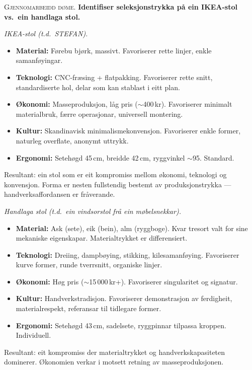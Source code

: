 \documentclass[10pt]{book}
\theoremstyle{definition}
\theoremstyle{plain}
\theoremstyle{remark}
\newenvironment{gjennomgang}%
  {\medskip\noindent\textsc{Gjennomarbeidd d\o me.}\enspace}%
  {\medskip}
\begin{document}
\begin{gjennomgang}
\textbf{Identifiser seleksjonstrykka p\aa{} ein IKEA-stol vs.\ ein handlaga stol.}

\textit{IKEA-stol (t.d.\ STEFAN).}
\begin{itemize}[nosep]
  \item \textbf{Material:} F\o rebu bj\o rk, massivt. Favoriserer rette linjer, enkle samanf\o yingar.
  \item \textbf{Teknologi:} CNC-fr\ae sing + flatpakking. Favoriserer rette snitt, standardiserte hol, delar som kan stablast i eitt plan.
  \item \textbf{\O konomi:} Masseproduksjon, l\aa g pris ($\sim$400\,kr). Favoriserer minimalt materialbruk, f\ae rre operasjonar, universell montering.
  \item \textbf{Kultur:} Skandinavisk minimalismekonvensjon. Favoriserer enkle former, naturleg overflate, anonymt uttrykk.
  \item \textbf{Ergonomi:} Seteh\o gd 45\,cm, breidde 42\,cm, ryggvinkel $\sim$95\textdegree. Standard.
\end{itemize}
Resultant: ein stol som er eit kompromiss mellom \o konomi, teknologi og konvensjon. Forma er nesten fullstendig bestemt av produksjonstrykka --- handverksaffordansen er fr\aa verande.

\textit{Handlaga stol (t.d.\ ein vindsorstol fr\aa{} ein m\o belsnekkar).}
\begin{itemize}[nosep]
  \item \textbf{Material:} Ask (sete), eik (bein), alm (ryggboge). Kvar tresort valt for sine mekaniske eigenskapar. Materialtrykket er differensiert.
  \item \textbf{Teknologi:} Dreiing, dampb\o ying, stikking, kilesamanf\o ying. Favoriserer kurve former, runde tverrsnitt, organiske linjer.
  \item \textbf{\O konomi:} H\o g pris ($\sim$15\,000\,kr+). Favoriserer singularitet og signatur.
  \item \textbf{Kultur:} Handverkstradisjon. Favoriserer demonstrasjon av ferdigheit, materialrespekt, referansar til tidlegare former.
  \item \textbf{Ergonomi:} Seteh\o gd 43\,cm, sadelsete, ryggpinnar tilpassa kroppen. Individuell.
\end{itemize}
Resultant: eit kompromiss der materialtrykket og handverkskapasiteten dominerer. \O konomien verkar i motsett retning av masseproduksjonen.
\end{gjennomgang}
\end{document}
